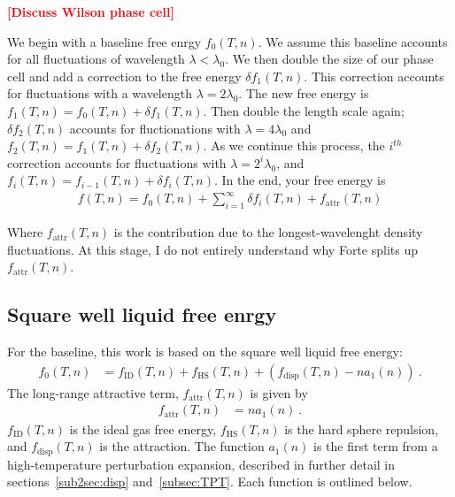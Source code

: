 \documentclass[letterpaper,twocolumn,amsmath,amssymb,prb]{revtex4-1}
\newcommand{\kT}{\ensuremath{k_BT}}
\newcommand{\fid}{\ensuremath{f_\text{ID}(T,n)}}
\newcommand{\fhs}{\ensuremath{f_\text{HS}(T,n)}}
\newcommand{\fdisp}{\ensuremath{f_\text{disp}(T,n)}}
\newcommand{\fattr}{\ensuremath{f_\text{attr}(T,n)}}
\newcommand{\1}{\ensuremath{\textbf{r}_1}}
\newcommand{\2}{\ensuremath{\textbf{r}_2}}
\newcommand{\fixme}[1]{\textcolor{red}{\textbf{[#1]}}}
\begin{document}
\fixme{Discuss Wilson phase cell}

We begin with a baseline free enrgy $f_0(T,n)$. We assume this baseline accounts for all fluctuations of wavelength $\lambda < \lambda_0$. We then double the size of our phase cell and add a correction to the free energy $\delta f_1(T,n)$. This correction accounts for fluctuations with a wavelength $\lambda = 2\lambda_0$. The new free energy is $f_1(T,n) = f_0(T,n) + \delta f_1(T,n)$. Then double the length scale again; $\delta f_2(T,n)$ accounts for fluctionations with $\lambda = 4\lambda_0$ and $f_2(T,n) = f_1(T,n) + \delta f_2(T,n)$. As we continue this process, the $i^{th}$ correction accounts for fluctuations with $\lambda = 2^i\lambda_0$, and $f_i(T,n) = f_{i-1}(T,n) + \delta f_i(T,n)$. In the end, your free energy is
\begin{align}
  f(T,n) = f_0(T,n) + \sum_{i=1}^\infty\delta f_i(T,n) + \fattr
\end{align}

Where $\fattr$ is the contribution due to the longest-wavelenght density fluctuations. At this stage, I do not entirely understand why Forte splits up $\fattr$.



\subsection{Square well liquid free enrgy}\label{subsec:SW}
For the baseline, this work is based on the square well liquid free energy:\cite{Hughes13}
\begin{align}
  f_0(T,n) &= \fid + \fhs + \left( \fdisp - n a_1(n) \right) \ .
\end{align}
The long-range attractive term, $\fattr$ is given by
\begin{align}
  \fattr &= n a_1(n) \ .
\end{align}
$\fid$ is the ideal gas free energy, $\fhs$ is the hard sphere repulsion, and $\fdisp$ is the attraction. The function $a_1(n)$ is the first term from a high-temperature perturbation expansion, described in further detail in sections~\ref{sub2sec:disp} and~\ref{subsec:TPT}. Each function is outlined below.
\end{document}
